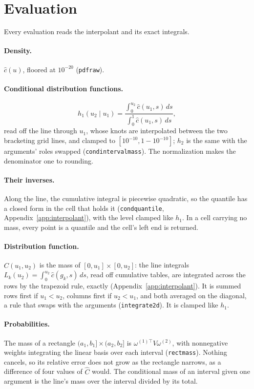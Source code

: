 \documentclass[11pt]{article}
\newcommand{\codeus}{\textunderscore\allowbreak}
\newcommand{\code}[1]{\begingroup\let\_\codeus\texttt{#1}\endgroup}
\begin{document}
\section{Evaluation}
\label{sec:evaluation}

Every evaluation reads the interpolant and its exact integrals.

\paragraph{Density.} $\hat c(u)$, floored at $10^{-20}$ (\code{pdf\_raw}).

\paragraph{Conditional distribution functions.}
\[
  h_1(u_2 \mid u_1) = \frac{\int_0^{u_2} \hat c(u_1, s)\, ds}
                           {\int_0^1 \hat c(u_1, s)\, ds},
\]
read off the line through $u_1$, whose knots are interpolated between the two
bracketing grid lines, and clamped to $[10^{-10}, 1 - 10^{-10}]$; $h_2$ is the
same with the arguments' roles swapped (\code{cond\_interval\_mass}). The
normalization makes the denominator one to rounding.

\paragraph{Their inverses.} Along the line, the cumulative integral is
piecewise quadratic, so the quantile has a closed form in the cell that holds
it (\code{cond\_quantile}, Appendix~\ref{app:interpolant}), with the level
clamped like $h_1$. In a cell carrying no mass, every point is a quantile and
the cell's left end is returned.

\paragraph{Distribution function.} $\hat C(u_1, u_2)$ is the mass of
$[0, u_1] \times [0, u_2]$: the line integrals $L_k(u_2) = \int_0^{u_2}
\hat c(g_k, s)\, ds$, read off cumulative tables, are integrated across the
rows by the trapezoid rule, exactly (Appendix~\ref{app:interpolant}). It is
summed rows first if $u_1 < u_2$, columns first if $u_2 < u_1$, and both
averaged on the diagonal, a rule that swaps with the arguments
(\code{integrate\_2d}). It is clamped like $h_1$.

\paragraph{Probabilities.} The mass of a rectangle $(a_1, b_1] \times
(a_2, b_2]$ is $\omega^{(1)\top} V \omega^{(2)}$, with nonnegative weights
integrating the linear basis over each interval (\code{rect\_mass}). Nothing
cancels, so its relative error does not grow as the rectangle narrows, as a
difference of four values of $\hat C$ would. The conditional mass of an
interval given one argument is the line's mass over the interval divided by
its total.
\end{document}
